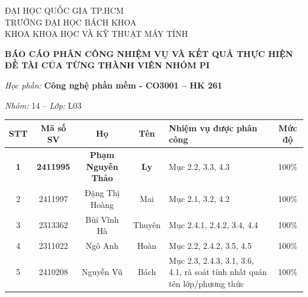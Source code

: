 {\RaggedRight
ĐẠI HỌC QUỐC GIA TP.HCM \\
TRƯỜNG ĐẠI HỌC BÁCH KHOA \\
KHOA KHOA HỌC VÀ KỸ THUẬT MÁY TÍNH
}

\begin{center}

\textbf{\large BÁO CÁO PHÂN CÔNG NHIỆM VỤ VÀ KẾT QUẢ THỰC HIỆN ĐỀ TÀI CỦA TỪNG THÀNH VIÊN NHÓM PI}

\vspace{0.3em}

\textit{Học phần:} \textbf{Công nghệ phần mềm - CO3001 -- HK 261}

\textit{Nhóm: }14 -- \textit{Lớp: } L03

\vspace{0.3em}

\begin{tabularx}{\textwidth}{|c|c|c|c|>{\centering\arraybackslash}X|c|}
    \hline
    \textbf{STT} & \textbf{Mã số SV} & \textbf{Họ} & \textbf{Tên} & \textbf{Nhiệm vụ được phân công} & \textbf{Mức độ} \\ 
    \hline
    \textbf{1} & \textbf{2411995} & \textbf{Phạm Nguyễn Thảo} & \textbf{Ly} & Mục 2.2, 3.3, 4.3 & 100\%\\
    \hline
    2 & 2411997 & Đặng Thị Hoàng & Mai & Mục 2.1, 3.2, 4.2 & 100\%\\
    \hline
    3 & 2313362 & Bùi Vĩnh Hà & Thuyên & Mục 2.4.1, 2.4.2, 3.4, 4.4 & 100\% \\
    \hline
    4 & 2311022 & Ngô Anh & Hoàn & Mục 2.2, 2.4.2, 3.5, 4.5 & 100\% \\
    \hline
    5 & 2410208 & Nguyễn Vũ & Bách & Mục 2.3, 2.4.3, 3.1, 3.6, 4.1, rà soát tính nhất quán tên lớp/phương thức & 100\% \\
    \hline
\end{tabularx}



\end{center}
